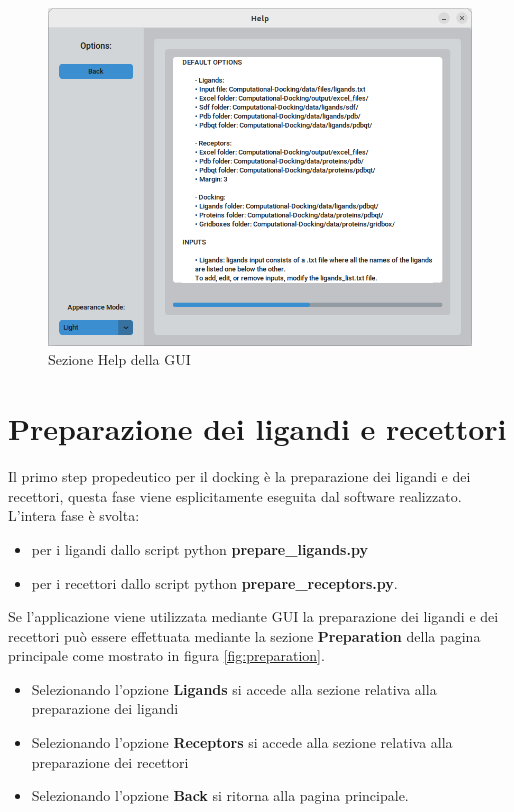 \begin{figure}[H]
    \centering
    \includegraphics[scale=0.6]{immagini/capitolo3/help.png}
    \caption{Sezione Help della GUI}
    \label{fig:help}
\end{figure}

\section{Preparazione dei ligandi e recettori}
Il primo step propedeutico per il docking è la preparazione dei ligandi e dei recettori, questa
fase viene esplicitamente eseguita dal software realizzato. L'intera fase è svolta:

\begin{itemize}
    \item per i ligandi dallo script python \textbf{prepare\_ligands.py}
    \item per i recettori dallo script python \textbf{prepare\_receptors.py}.
\end{itemize}

Se l'applicazione viene utilizzata mediante GUI la preparazione dei ligandi e dei recettori può essere effettuata mediante la sezione \textbf{Preparation} della pagina principale come mostrato in figura \ref{fig:preparation}.

\begin{itemize}
    \item Selezionando l'opzione \textbf{Ligands} si accede alla sezione relativa alla preparazione dei ligandi
    \item Selezionando l'opzione \textbf{Receptors} si accede alla sezione relativa alla preparazione dei recettori
    \item Selezionando l'opzione \textbf{Back} si ritorna alla pagina principale.
\end{itemize}



